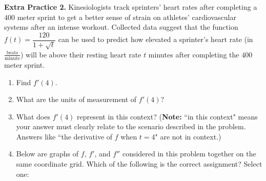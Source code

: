 \documentclass[10pt]{article}
\begin{document}
{\bf\color{blue}Extra Practice 2.} %
Kinesiologists track sprinters' heart rates after completing a $400$ meter sprint to get a better sense of strain on athletes' cardiovascular systems after an intense workout. Collected data suggest that the function $f(t)=\dfrac{120}{1+\sqrt{t}}$ can be used to predict how elevated a sprinter's heart rate (in $\frac{\text{beats}}{\text{minute}}$) will be above their resting heart rate $t$ minutes after completing the $400$ meter sprint.


\begin{enumerate}


\item[(a)] Find $f'(4)$. 


\vfill
\vfill

\item[(b)] What are the units of measurement of $f'(4)$? 

\item[(c)] What does $f'(4)$ represent in this context? ({\bf Note:} ``in this context" means your answer must clearly relate to the scenario described in the problem. Answers like ``the derivative of $f$ when $t=4$" are not in context.)


\vfill

\item[(d)] Below are graphs of $f$, $f'$, and $f''$ considered in this problem together on the same coordinate grid. Which of the following is the correct assignment? Select one:\\


\end{enumerate}
\end{document}
